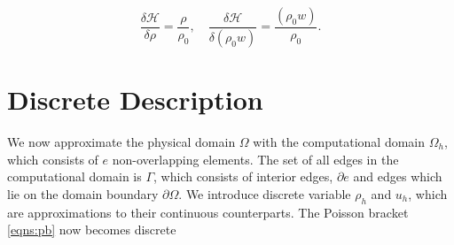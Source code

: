 \documentclass[a4paper,11pt]{article}
\begin{document}
\begin{equation}
\frac{\delta \mathcal{H}}{\delta \rho} =\frac{\rho}{\rho_0}, \quad
\frac{\delta \mathcal{H}}{\delta (\rho_0 w)}= \frac{(\rho_0 w)}{\rho_0}.
\end{equation}

%
%


\section{ Discrete Description}

 We now approximate the physical domain $\Omega$ with the computational domain $\Omega_h$, which consists of $e$ non-overlapping elements. The set of all edges in the computational domain is $\Gamma$, which consists of interior edges, $\partial e $ and edges which lie on the domain boundary $\partial \Omega$. We introduce discrete variable $\rho_h$ and $u_h$, which are approximations to their continuous counterparts. The Poisson bracket \eqref{eqns:pb} now becomes discrete
\end{document}
